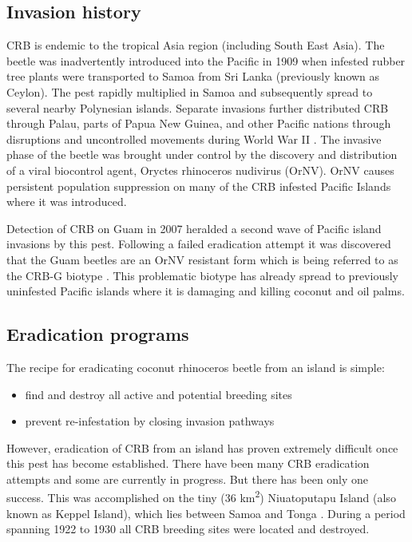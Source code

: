 \documentclass[12pt,letterpaper,english,bibliography=totocnumbered, abstract=on]{scrartcl}
\begin{document}
\subsection{Invasion history}

CRB is endemic to the tropical Asia region (including South East Asia).
The beetle was inadvertently introduced into the Pacific in 1909 when infested rubber tree plants were transported to Samoa from Sri Lanka (previously known as Ceylon). The pest rapidly multiplied in Samoa and subsequently spread to several nearby Polynesian islands. Separate invasions further distributed CRB through Palau, parts of Papua New Guinea, and other Pacific nations through disruptions and uncontrolled movements during World War II . The invasive phase of the beetle was brought under control by the discovery and distribution of a viral biocontrol agent, Oryctes rhinoceros nudivirus (OrNV). OrNV causes persistent population suppression on many of the CRB infested Pacific Islands where it was introduced.

Detection of CRB on Guam in 2007 heralded a second wave of Pacific island invasions by this pest. Following a failed eradication attempt it was discovered that the Guam beetles are an OrNV resistant form which is being referred to as the CRB-G biotype . This problematic biotype has already spread to previously uninfested Pacific islands where it is damaging and killing coconut and oil palms.

\subsection{Eradication programs}

The recipe for eradicating coconut rhinoceros beetle from an island is simple:

\begin{itemize}
	\item find and destroy all active and potential breeding sites
	\item prevent re-infestation by closing invasion pathways
\end{itemize}

However, eradication of CRB from an island has proven extremely difficult once this pest has become established. There have been many CRB eradication attempts and some are currently in progress. But there has been only one success. This was accomplished on the tiny (36 km\textsuperscript{2}) Niuatoputapu Island (also known as Keppel Island), which lies between Samoa and Tonga \parencite{catley_coconut_1969}. During a period spanning 1922 to 1930 all CRB breeding sites were located and destroyed.
\end{document}
